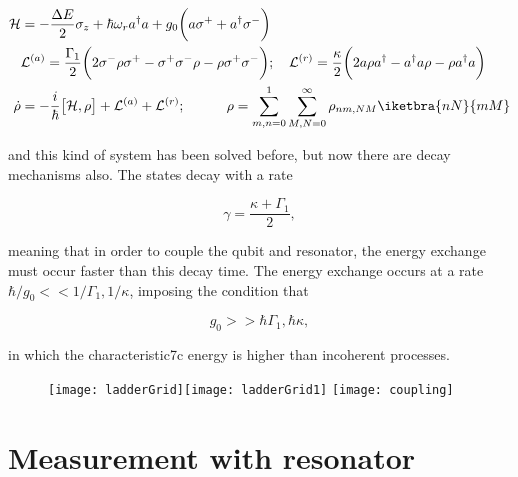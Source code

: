 \noindent {}

\begin{equation}\label{ar1}
  \begin{aligned}
    \mathcal{H} & ={-\frac{\Delta E}{2}\sigma_z}+{{\hbar\omega_r}a^\dagger a} + {g_0\bigg({a\sigma^+}+{a^{\dagger}\sigma^-}\bigg)}\\
    &\mathcal{L}^{(a)} = \frac{\Gamma_1}{2}\bigg(2\sigma^{-}\rho \sigma^{+}-\sigma^{+}\sigma^{-}\rho-\rho \sigma^{+}\sigma^{-}\bigg);\quad\mathcal{L}^{(r)} = \frac{\kappa}{2}\bigg(2a\rho a^{\dagger}-a^{\dagger}a\rho-\rho a^{\dagger}a\bigg)\\
    \dot{\rho} & = -\frac{i}{\hbar}\big[\mathcal{H},\rho\big]+\mathcal{L}^{(a)}+\mathcal{L}^{(r)};\quad\quad\quad \rho = \sum_{m,n=0}^{1}\sum_{M,N=0}^{\infty}\rho_{nm,NM}\iketbra{nN}{mM}\\
  \end{aligned}
\end{equation}

\noindent and this kind of system  has been solved before, but now there
are decay mechanisms also.  The states decay with a rate

\begin{equation}\label{ardecay}
  \gamma=\frac{\kappa+\Gamma_1}{2},
\end{equation}

\noindent meaning that  in order to couple the qubit  and resonator, the
energy  exchange must  occur faster  than this  decay time.   The energy
exchange occurs at a rate  $ \hbar/g_0 << 1/\Gamma_1,1/\kappa$, imposing
the condition that

\begin{equation}\label{arD}
  g_0>>\hbar\Gamma_1,\hbar\kappa,
\end{equation}

\noindent in which the characteristic7c energy is higher than incoherent
processes.

\begin{figure}[h]
  \centering%
  \texttt{[image: ladderGrid]}\texttt{[image: ladderGrid1]}
  \texttt{[image: coupling]}
\end{figure}


\newpage
\section{Measurement with resonator}
\label{sec:meas-with-reson}

